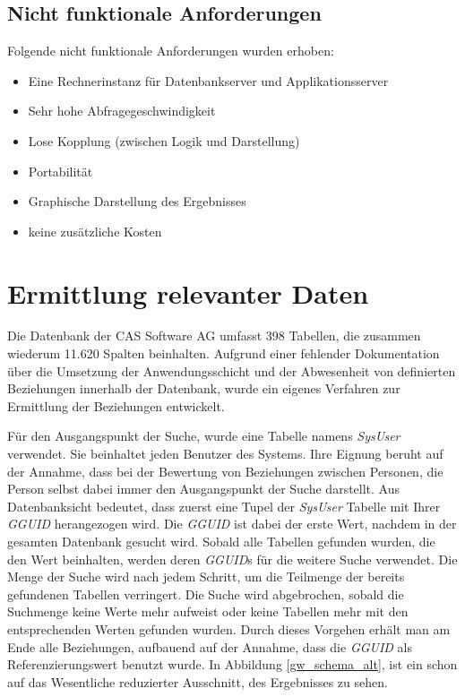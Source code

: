 \subsection{Nicht funktionale Anforderungen}

Folgende nicht funktionale Anforderungen wurden erhoben:

\begin{itemize}
	
	\item Eine Rechnerinstanz für Datenbankserver und Applikationsserver 
	
	\item Sehr hohe Abfragegeschwindigkeit
	
	\item Lose Kopplung	(zwischen Logik und Darstellung)
	
	\item Portabilität
	
	\item Graphische Darstellung des Ergebnisses
	
	\item keine zusätzliche Kosten

\end{itemize}

\section{Ermittlung relevanter Daten}
\label{ch:Systemanalyse:sec:Information}

Die Datenbank der CAS Software AG umfasst 398 Tabellen, die zusammen wiederum 11.620 Spalten beinhalten. Aufgrund einer fehlender Dokumentation über die Umsetzung der Anwendungsschicht und der Abwesenheit von definierten Beziehungen innerhalb der Datenbank, wurde ein eigenes Verfahren zur Ermittlung der Beziehungen entwickelt. 

Für den Ausgangspunkt der Suche, wurde eine Tabelle namens \textit{SysUser} verwendet. Sie beinhaltet jeden Benutzer des Systems. Ihre Eignung beruht auf der Annahme, dass bei der Bewertung von Beziehungen zwischen Personen, die Person selbst dabei immer den Ausgangspunkt der Suche darstellt. Aus Datenbanksicht bedeutet, dass zuerst eine Tupel der \textit{SysUser} Tabelle mit Ihrer \textit{GGUID} herangezogen wird. Die \textit{GGUID} ist dabei der erste Wert, nachdem in der gesamten Datenbank gesucht wird. Sobald alle Tabellen gefunden wurden, die den Wert beinhalten, werden deren \textit{GGUID}s für die weitere Suche verwendet. Die Menge der Suche wird nach jedem Schritt, um die Teilmenge der bereits gefundenen Tabellen verringert. Die Suche wird abgebrochen, sobald die Suchmenge keine Werte mehr aufweist oder keine Tabellen mehr mit den entsprechenden Werten gefunden wurden. Durch dieses Vorgehen erhält man am Ende alle Beziehungen, aufbauend auf der Annahme, dass die \textit{GGUID} als Referenzierungswert benutzt wurde. In Abbildung \ref{gw_schema_alt}, ist ein schon auf das Wesentliche reduzierter Ausschnitt, des Ergebnisses zu sehen. 

